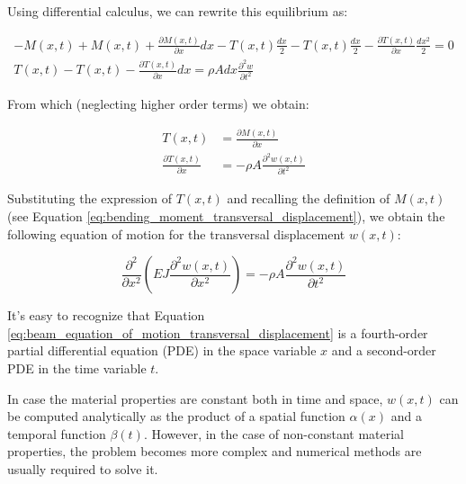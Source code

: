 Using differential calculus, we can rewrite this equilibrium as:

\begin{equation}
    \begin{matrix}
        -M(x,t) + M(x, t) + \frac{\partial M(x,t)}{\partial x} dx - T(x,t) \frac{dx}{2} - T(x,t) \frac{dx}{2} - \frac{\partial T(x,t)}{\partial x} \frac{dx^2}{2} = 0 \\
        T(x, t) - T(x, t) - \frac{\partial T(x, t)}{\partial x} dx = \rho A dx \frac{\partial^2 w}{\partial t^2}
    \end{matrix}
\end{equation}

From which (neglecting higher order terms) we obtain:

\begin{equation}
    \begin{aligned}
        T(x, t)                            & = \frac{\partial M(x,t)}{\partial x}              \\
        \frac{\partial T(x,t)}{\partial x} & = - \rho A \frac{\partial^2 w(x,t)}{\partial t^2}
    \end{aligned}
\end{equation}

Substituting the expression of $T(x,t)$ and recalling the definition of $M(x, t)$ (see Equation \ref{eq:bending_moment_transversal_displacement}), we obtain the following equation of motion for the transversal displacement $w(x,t)$:

\begin{equation}
    \frac{\partial^2}{\partial x^2} \left( EJ \frac{\partial^2 w(x,t)}{\partial x^2} \right) = -\rho A \frac{\partial^2 w(x,t)}{\partial t^2}
    \label{eq:beam_equation_of_motion_transversal_displacement}
\end{equation}

It's easy to recognize that Equation \ref{eq:beam_equation_of_motion_transversal_displacement} is a fourth-order partial differential equation (PDE) in the space variable $x$ and a second-order PDE in the time variable $t$.

In case the material properties are constant both in time and space, $w(x,t)$ can be computed analytically as the product of a spatial function $\alpha(x)$ and a temporal function $\beta(t)$.
However, in the case of non-constant material properties, the problem becomes more complex and numerical methods are usually required to solve it.
